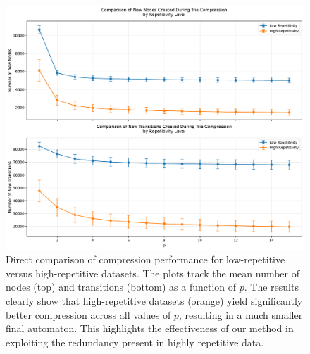 \begin{figure}[H]
    \centering
    \includegraphics[width=1\linewidth]{Immagini/high_low_comparison.pdf}
    \caption{Direct comparison of compression performance for low-repetitive versus high-repetitive datasets. The plots track the mean number of nodes (top) and transitions (bottom) as a function of $p$. The results clearly show that high-repetitive datasets (orange) yield significantly better compression across all values of $p$, resulting in a much smaller final automaton. This highlights the effectiveness of our method in exploiting the redundancy present in highly repetitive data.}
    \label{fig:exp_comparison}
\end{figure}